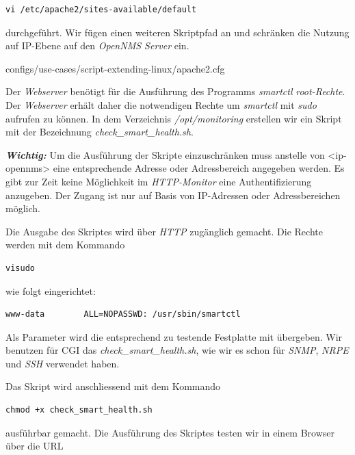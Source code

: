 \begin{lstlisting}[numbers=none]
vi /etc/apache2/sites-available/default
\end{lstlisting}

durchgeführt. Wir fügen einen weiteren Skriptpfad an und schränken die Nutzung auf IP-Ebene auf den \emph{OpenNMS Server} ein.


  {configs/use-cases/script-extending-linux/apache2.cfg}

Der \emph{Webserver} benötigt für die Ausführung des Programms \emph{smartctl} \emph{root-Rechte}. Der \emph{Webserver} erhält daher die notwendigen Rechte um \emph{smartctl} mit \emph{sudo} aufrufen zu können. In dem Verzeichnis \emph{/opt/monitoring} erstellen wir ein Skript mit der Bezeichnung \emph{check\_smart\_health.sh}. 

\textbf{\textit{Wichtig:}} Um die Ausführung der Skripte einzuschränken muss anstelle von <ip-opennms> eine entsprechende Adresse oder Adressbereich angegeben werden. Es gibt zur Zeit keine Möglichkeit im \emph{HTTP-Monitor} eine Authentifizierung anzugeben. Der Zugang ist nur auf Basis von IP-Adressen oder Adressbereichen möglich.

Die Ausgabe des Skriptes wird über \emph{HTTP} zugänglich gemacht. Die Rechte werden mit dem Kommando

\begin{lstlisting}[numbers=none]
visudo
\end{lstlisting}

wie folgt eingerichtet:

\begin{lstlisting}[numbers=none]
www-data        ALL=NOPASSWD: /usr/sbin/smartctl
\end{lstlisting}

Als Parameter wird die entsprechend zu testende Festplatte mit übergeben. Wir benutzen für CGI das \emph{check\_smart\_health.sh}, wie wir es schon für \emph{SNMP}, \emph{NRPE} und \emph{SSH} verwendet haben.

Das Skript wird anschliessend mit dem Kommando

\begin{lstlisting}[numbers=none]
chmod +x check_smart_health.sh
\end{lstlisting}

ausführbar gemacht. Die Ausführung des Skriptes testen wir in einem Browser über die URL

